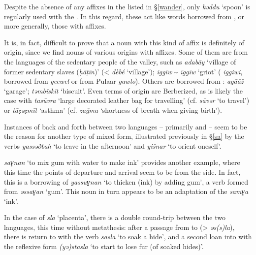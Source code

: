\documentclass[output=paper]{langsci/langscibook}
\begin{document}

Despite the absence of any  affixes in the  listed in §\ref{wander}, only \textit{kəddu} ‘spoon’ is regularly used with the  . In this regard, these  act like words borrowed from , or more generally, those with  affixes. 

It is, in fact, difficult to prove that a noun with this kind of affix is definitely of  origin, since we find nouns of various origins with  affixes. Some of them are  from the languages of the sedentary people of the valley, such as \textit{adabāy} ‘village of former sedentary slaves (\textit{ḥ{\R}āṭīn})’ (<  \textit{dèbé} ‘village’); \textit{iggīw} \~{} \textit{īggīw} ‘griot’ ( \textit{iggiwi}, borrowed from  \textit{geewel} or from Pulaar \textit{gawlo}). Others are borrowed from : \textit{agā{\R}āž} ‘garage’; \textit{təmbīskit} ‘biscuit’. Even terms of  origin are Berberized, as is likely the case with \textit{tasūvra} ‘large decorated leather bag for travelling’ (cf. \textit{sāvər} ‘to travel’) or \textit{tāẓəẓmīt} ‘asthma’ (cf.  \textit{zaǧma} ‘shortness of breath when giving birth’).


Instances of back and forth between two languages – primarily  and  – seem to be the reason for another type of mixed form, illustrated previously in §\ref{sa} by the  verbs \textit{yassəðbah} ‘to leave in the afternoon’ and \textit{yišnar} ‘to orient oneself’.

 \textit{saɣnan} ‘to mix gum with water to make ink’ provides another example, where this time the points of departure and arrival seem to be from the  side. In fact, this  is a borrowing of  \textit{yassuɣnan} ‘to thicken (ink) by adding gum’, a verb formed from \textit{əssaɣan} ‘gum’. This noun in turn appears to be an adaptation of the  \textit{samɣa} ‘ink’. 

In the case of \textit{sla} ‘placenta’, there is a double round-trip between the two languages, this time without metathesis: after a passage from  to  (> \textit{əs(s)la}), there is return to  with the  verb \textit{sasla} ‘to soak a hide’, and a second loan into  with the reflexive form \textit{(yə)stasla} ‘to start to lose fur (of soaked hides)’.
\end{document}
